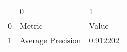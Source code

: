 \begin{tabular}{lll}
 & 0 & 1 \\
0 & Metric & Value \\
1 & Average Precision & 0.912202 \\
\end{tabular}
